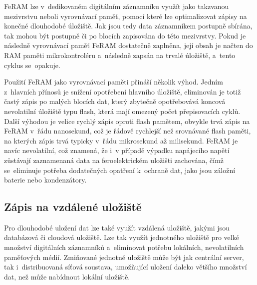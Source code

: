FeRAM lze v~dedikovaném digitálním záznamníku využít jako takzvanou mezivrstvu neboli vyrovnávací paměť, pomocí které lze optimalizovat zápisy na konečné dlouhodobé úložiště. Jak jsou tedy data záznamníkem postupně sbírána, tak mohou být postupně či po blocích zapisována do této mezivrstvy. Pokud je následně vyrovnávací paměť FeRAM dostatečně zaplněna, její obsah je načten do RAM paměti mikrokontroléru a~následně zapsán na trvalé úložiště, a~tento cyklus se~opakuje.~\cite{ieee_feram_ultra_high_density_embedded_mem, non_volatile_memories}

Použití FeRAM jako vyrovnávací paměti přináší několik výhod. Jedním z~hlavních přínosů je snížení opotřebení hlavního úložiště, eliminován je totiž častý zápis po malých blocích dat, který zbytečně opotřebovává koncová nevolatilní úložiště typu flash, která mají omezený počet přepisovacích cyklů. Další výhodou je velice rychlý zápis oproti flash pamětem, obvykle trvá zápis na FeRAM v~řádu nanosekund, což je řádově rychlejší než srovnávané flash paměti, na kterých zápis trvá typicky v~řádu mikrosekund až milisekund. FeRAM je navíc nevolatilní, což znamená, že i~v případě výpadku napájecího napětí zůstávají zaznamenaná data na feroelektrickém uložišti zachována, čímž se~eliminuje potřeba dodatečných opatření k~ochraně dat, jako jsou záložní baterie nebo kondenzátory.~\cite{ieee_feram_ultra_high_density_embedded_mem, non_volatile_memories}

\subsection{Zápis na vzdálené uložiště}
\label{zapis_na_vzdalene_uloziste}
Pro dlouhodobé uložení dat lze také využít vzdálená uložiště, jakými jsou databázová či cloudová uložiště. Lze tak využít jednotného uložiště pro velké množství digitálních záznamníků a~eliminovat potřebu lokálních, nevolatilních paměťových médií. Zmiňované jednotné uložiště může být jak centrální server, tak i~distribuovaná síťová soustava, umožňující uložení daleko většího množství dat, než může nabídnout lokální uložiště.~\cite{springer_analysis_time_series_db_edge_computing, iot_datalogger_with_timestamping}

